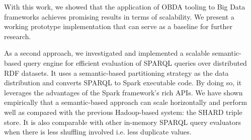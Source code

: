 With this work, we showed that the application of OBDA tooling to Big Data frameworks achieves promising results in terms of scalability. 
We present a working prototype implementation that can serve as a baseline for further research.

As a second approach, we investigated and implemented a scalable semantic-based query engine for efficient evaluation of \gls{SPARQL} queries over distributed \gls{RDF} datasets. 
It uses a semantic-based partitioning strategy as the data distribution and converts \gls{SPARQL} to Spark executable code.
By doing so, it leverages the advantages of the Spark framework's rich \gls{API}s.
We have shown empirically that a semantic-based approach can scale horizontally and perform well as compared with the previous Hadoop-based system: the SHARD triple store.
It is also comparable with other in-memory \gls{SPARQL} query evaluators when there is less shuffling involved i.e. less duplicate values.
